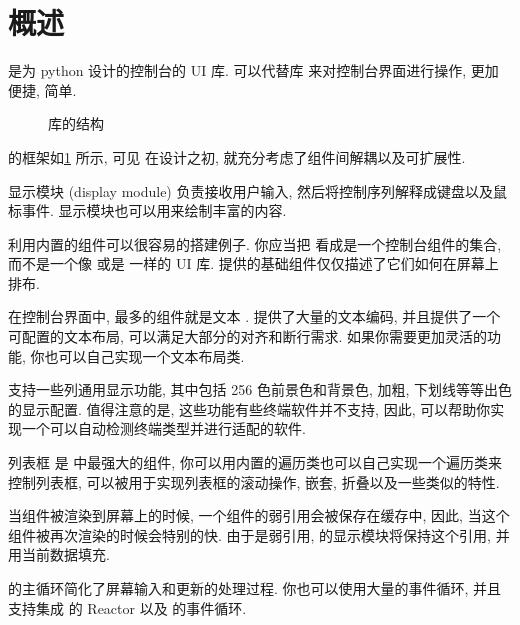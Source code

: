 \section[urwid 概述]{\urwid{} 概述}
\indent\urwid{} 是为 python 设计的控制台的 UI 库. \urwid{} 可以代替库  来对控制台界面进行操作, 更加便捷, 简单.%
%
\begin{figure}[!htb]
    \centering
    
    \caption{\urwid{} 库的结构}
    \label{fig:structure_of_urwid_library}
\end{figure}%
%
\urwid{} 的框架如\cref{fig:structure_of_urwid_library} 所示, 可见 \urwid{} 在设计之初, 就充分考虑了组件间解耦以及可扩展性.

显示模块 (display module) 负责接收用户输入, 然后将控制序列解释成键盘以及鼠标事件. 显示模块也可以用来绘制丰富的内容.

利用内置的组件可以很容易的搭建例子. 你应当把 \urwid{} 看成是一个控制台组件的集合, 而不是一个像  或是  一样的 UI 库. \urwid{} 提供的基础组件仅仅描述了它们如何在屏幕上排布.

在控制台界面中, 最多的组件就是文本 . \urwid{} 提供了大量的文本编码, 并且提供了一个可配置的文本布局, 可以满足大部分的对齐和断行需求. 如果你需要更加灵活的功能, 你也可以自己实现一个文本布局类.

\urwid{} 支持一些列通用显示功能, 其中包括 256 色前景色和背景色, 加粗, 下划线等等出色的显示配置. 值得注意的是, 这些功能有些终端软件并不支持, 因此, \urwid{} 可以帮助你实现一个可以自动检测终端类型并进行适配的软件.

列表框  是 \urwid{} 中最强大的组件, 你可以用内置的遍历类也可以自己实现一个遍历类来控制列表框, 可以被用于实现列表框的滚动操作, 嵌套, 折叠以及一些类似的特性.

当组件被渲染到屏幕上的时候, 一个组件的弱引用会被保存在缓存中, 因此, 当这个组件被再次渲染的时候会特别的快. 由于是弱引用, \urwid{} 的显示模块将保持这个引用, 并用当前数据填充.

\urwid{} 的主循环简化了屏幕输入和更新的处理过程. 你也可以使用大量的事件循环, 并且支持集成  的 Reactor 以及  的事件循环.